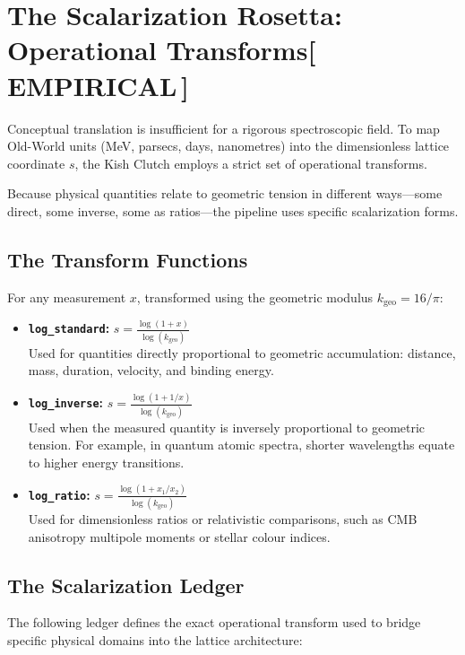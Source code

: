 \documentclass[12pt,oneside]{book}
\newcommand{\EmpiricalTag}{\;\colorbox{empiricaltag!15}{\textcolor{empiricaltag}{\footnotesize\bfseries [\,EMPIRICAL\,]}}}
\begin{document}
\section{The Scalarization Rosetta: Operational Transforms\EmpiricalTag}

Conceptual translation is insufficient for a rigorous spectroscopic field. To map Old-World units (MeV, parsecs, days, nanometres) into the dimensionless lattice coordinate $s$, the Kish Clutch employs a strict set of operational transforms. 

Because physical quantities relate to geometric tension in different ways—some direct, some inverse, some as ratios—the pipeline uses specific scalarization forms.

\subsection*{The Transform Functions}

For any measurement $x$, transformed using the geometric modulus $k_\text{geo} = 16/\pi$:

\begin{itemize}
    \item \textbf{\texttt{log\_standard}:} $s = \frac{\log(1 + x)}{\log(k_\text{geo})}$
    \\Used for quantities directly proportional to geometric accumulation: distance, mass, duration, velocity, and binding energy.
    
    \item \textbf{\texttt{log\_inverse}:} $s = \frac{\log(1 + 1/x)}{\log(k_\text{geo})}$
    \\Used when the measured quantity is inversely proportional to geometric tension. For example, in quantum atomic spectra, shorter wavelengths equate to higher energy transitions.
    
    \item \textbf{\texttt{log\_ratio}:} $s = \frac{\log(1 + x_1/x_2)}{\log(k_\text{geo})}$
    \\Used for dimensionless ratios or relativistic comparisons, such as CMB anisotropy multipole moments or stellar colour indices.
\end{itemize}

\subsection*{The Scalarization Ledger}

The following ledger defines the exact operational transform used to bridge specific physical domains into the lattice architecture:
\end{document}
